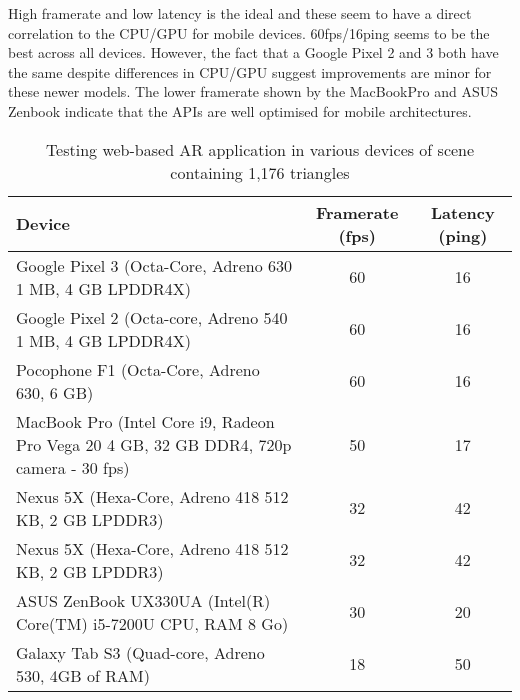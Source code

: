 \documentclass{egpubl}
\begin{document}
High framerate and low latency is the ideal and these seem to have a direct
correlation to the CPU/GPU for mobile devices. 60fps/16ping seems to be the
best across all devices. However, the fact that a Google Pixel 2 and 3 both
have the same despite differences in CPU/GPU suggest improvements are minor
for these newer models. The lower framerate shown by the MacBookPro
and ASUS Zenbook indicate that the APIs are well optimised for mobile
architectures.


\begin{table}[h] \centering 
\begin{tabular}{|p{90px}|c|c|} \hline Device & 
Framerate (fps) & Latency (ping)\\  \hline \hline 
Google Pixel 3 (Octa-Core,
Adreno 630 1 MB, 4 GB LPDDR4X) &  60 & 16\\ \hline
 Google Pixel 2 (Octa-core,
Adreno 540 1 MB, 4 GB LPDDR4X)  &  60 & 16\\ \hline
Pocophone F1 (Octa-Core, Adreno 630, 6 GB) & 60 & 16 \\ \hline 
MacBook Pro
(Intel Core i9, Radeon Pro Vega 20 4 GB, 32 GB DDR4, 720p camera - 30 fps)  &
50 & 17\\ \hline 
Nexus 5X (Hexa-Core, Adreno 418 512 KB, 2 GB LPDDR3) & 32 &
42 \\ \hline  
Nexus 5X (Hexa-Core, Adreno 418 512 KB, 2 GB LPDDR3) & 32 & 42
\\ \hline 
ASUS ZenBook UX330UA (Intel(R) Core(TM) i5-7200U CPU, RAM 8 Go) & 30
& 20\\ \hline 
Galaxy Tab S3 (Quad-core, Adreno 530, 4GB of RAM) & 18 & 50\\
\hline \end{tabular} 
\caption{Testing web-based AR application in various
devices of scene containing 1,176 triangles} \label{table:framerates} 
\end{table}




\end{document}
